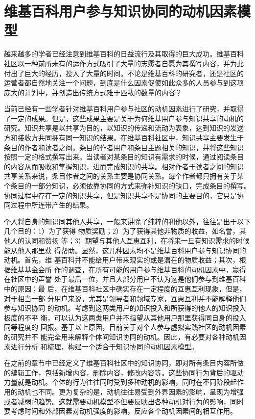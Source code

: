 
\chapter{维基百科用户参与知识协同的动机因素模型}
\label{cha:motivation}



越来越多的学者已经注意到维基百科的日益流行及其取得的巨大成功。维基百科
社区以一种前所未有的运作方式吸引了大量的志愿者自愿为其撰写内容，并为此
付出了巨大的经历，投入了大量的时间。不论是维基百科的研究者，还是社区的
运营者都自然地关注一个问题，到底是什么因素促使如此众多的人员参与到这项
庞大的计划中，并创造出传统方式难于匹敌的数量的内容？

当前已经有一些学者针对维基百科用户参与社区的动机因素进行了研究，并取得
了一定的成果。但是，这些成果主要是关于为何维基用户参与知识共享的动机的
研究。知识共享是以共享为目的，以知识的传递和流动为表象，达到知识的发送
方和接收方共同拥有同一知识的结果。在维基百科社区中，知识共享主要发生于
条目的作者和读者之间。条目的作者用户和条目主题相关的知识，并将这些知识
按照一定的格式撰写出来。当读者对某条目的知识有需求的时候，通过阅读条目
的内容从而吸收和掌握知识，进而完成知识的共享。相对作者于读者之间的知识
共享关系来说，条目作者之间的关系主要是协同关系。每个作者都只拥有关于某
个条目的一部分知识，必须依靠协同的方式来弥补知识的缺口，完成条目的撰写。
协同过程中存在一定的知识共享，但是知识共享不是协同的主要目的，它只是协
同过程中所连带产生的结果。

个人将自身的知识同其他人共享，一般来讲除了纯粹的利他以外，往往是出于以下几个目的：1）为了获得
物质奖励；2）为了获得其他非物质的收益，如名誉，其他人的认同和赞扬
等；3）期望与其他人互惠互利，在将来一旦有知识需求的时候能从他人那里获
得帮助。显然，这几种因素均不是维基百科用户参与知识协同的动机。首先，维
基百科并不能给用户带来现实的或是潜在的物质收益；其次，根据维基基金会所
作的调查，在所有可能的用户参与维基百科的动机因素中，赢得在社区中的声誉
处于最后一位，并且大部分用户不认为这是他们参与到维基百科中的原因；最
后，在维基百科社区中确实存在一定程度的互惠互利现象，但是，对于相当一部
分用户来说，尤其是领导者和领域专家，互惠互利并不能解释他们参与知识协同
的动机。考虑到这两类用户的知识投入和所获得的他人的知识投入极度的不平
衡，可以认为这两类用户并不指望从其他用户那里获得同自身的投入同等程度的
回报。基于以上原因，目前关于对个人参与虚拟实践社区的动机因素的研究并不
能完全用来解释个体间知识协同的动机。因此，有必要对各种动机因素进行分析
和梳理，构建一个适合于知识协同的动机因素模型。

在之前的章节中已经定义了维基百科社区中的知识协同，即对所有条目内容所做
的编辑工作，包括新增内容，删除内容，修改内容等。这些协同行为背后的驱动
力量就是动机。个体的行为往往同时受到多种动机的影响，同时在不同阶段起作
用的动机也不同。更为复杂的是，动机往往易受到外界因素的影响，呈现为增强
或者减弱的趋势。这就需要动机模型不但要反映出各种动机对行为的影响，同时
要考虑时间和外部因素对动机强度的影响，反应各个动机因素间的相互作用。


